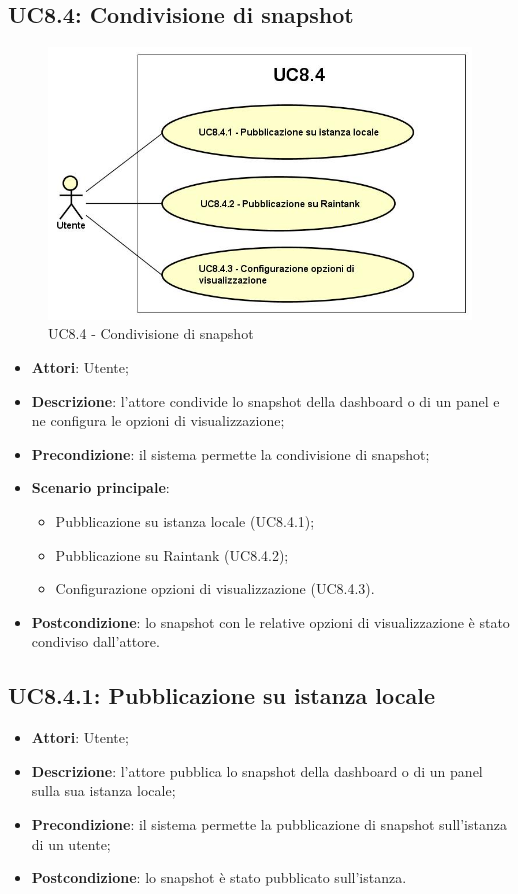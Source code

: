 \subsection{UC8.4: Condivisione di snapshot}
\hypertarget{UC8.4}{}
\begin{figure} [H]
	\centering
	\includegraphics[scale=0.45]{Img/UC8-4}
	\caption{UC8.4 - Condivisione di snapshot}\label{}
\end{figure}
\begin{itemize}
	\item \textbf{Attori}: Utente;
	\item \textbf{Descrizione}: l'attore condivide lo snapshot della dashboard o di un panel e ne configura le opzioni di visualizzazione;
	\item \textbf{Precondizione}: il sistema permette la condivisione di snapshot;
	\item \textbf{Scenario principale}:
	\begin{itemize}
		\item Pubblicazione su istanza locale (UC8.4.1);
		\item Pubblicazione su Raintank (UC8.4.2);
		\item Configurazione opzioni di visualizzazione (UC8.4.3).
	\end{itemize}
	\item \textbf{Postcondizione}: lo snapshot con le relative opzioni di visualizzazione è stato condiviso dall'attore.
\end{itemize}

\subsection{UC8.4.1: Pubblicazione su istanza locale}
\hypertarget{UC8.4.1}{}
\begin{itemize}
	\item \textbf{Attori}: Utente;
	\item \textbf{Descrizione}: l'attore pubblica lo snapshot della dashboard o di un panel sulla sua istanza locale;
	\item \textbf{Precondizione}: il sistema permette la pubblicazione di snapshot sull'istanza di un utente;
	\item \textbf{Postcondizione}: lo snapshot è stato pubblicato sull'istanza.
\end{itemize}

